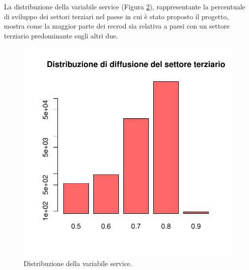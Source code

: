 \begin{figure}%
	\centering
	\qquad
	\caption{}%
	\label{fig:piecategory}%
\end{figure}

La distribuzione della variabile service (Figura \ref{fig:barlpotservice}), rappresentante la percentuale di sviluppo dei settori terziari nel paese in cui è stato proposto il progetto, mostra come la maggior parte dei recrod sia relativa a paesi con un settore terziario predominante sugli altri due.   

\begin{figure}
	\centering
	\includegraphics[width=0.7\linewidth]{../FinalResults/Images/Data_exploration_plots/barlpot_service}
	\caption{Distribuzione della variabile service.}
	\label{fig:barlpotservice}
\end{figure}

